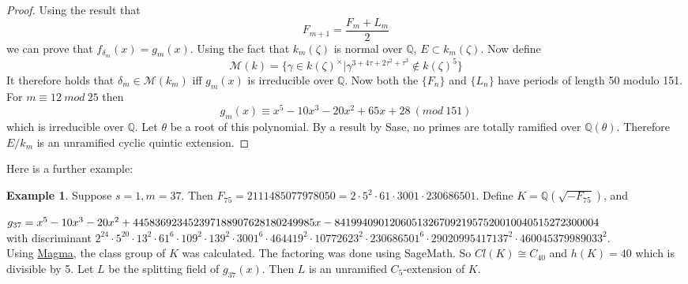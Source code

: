 \documentclass[12pt]{extarticle}
\newcommand{\Q}{\mathbb{Q}}
\newcommand{\<}{\langle}
\renewcommand{\>}{\rangle}
\theoremstyle{definition}
\newtheorem*{example}{Example}
\begin{document}
\begin{proof}
Using the result that \begin{equation}
    F_{m+1}= \frac{F_m + L_m}{2}
\end{equation}
we can prove that $f_{\delta_m}(x) = g_m(x)$. Using the fact that $k_m(\zeta)$ is normal over $\Q$, $E\subset k_m(\zeta)$. Now define  \begin{equation}
    \mathcal{M}(k)=\{\gamma \in k(\zeta)^{\times}|\gamma^{3+4\tau+2\tau^{2}+\tau^3}\notin k(\zeta)^5\}
\end{equation}
It therefore holds that $\delta_m \in \mathcal{M}(k_m)$ iff $g_m(x)$ is irreducible over $\Q$. Now both the $\{F_n\}$ and $\{L_n\}$ have periods of length 50 modulo 151. For $m\equiv12 \: mod \: 25$ then \begin{equation}
    g_m(x) \equiv x^5 - 10x^3 - 20x^2 + 65x + 28\:(mod \:151)
\end{equation} which is irreducible over $\Q$. Let $\theta$ be a root of this polynomial. By a result by Sase, no primes are totally ramified over $\Q(\theta)$. Therefore $E/k_m$ is an unramified cyclic quintic extension. 
\end{proof}
Here is a further example:
\begin{example}
Suppose $s=1, m= 37$. Then $F_{75} = 2111485077978050 = 2 \cdot 5^2 \cdot 61 \cdot 3001 \cdot 230686501$. Define $K = \Q(\sqrt{-F_{75}})$, and 


$g_{37} = x^5 - 10x^3 - 20x^2 + \\445836923452397188907628180249985x  \\- 841994090120605132670921957520010040515272300004
$ \\
with discriminant $2^{24} \cdot 5^{20} \cdot 13^2 \cdot 61^6 \cdot 109^2 \cdot 139^2 \cdot 3001^6 \cdot 464419^2 \cdot 10772623^2 \cdot 230686501^6 \cdot 29020995417137^2 \cdot 460045379989033^2$.  \\
Using \href{http://magma.maths.usyd.edu.au/calc/}{Magma}, the class group of $K$ was calculated. The factoring was done using SageMath. So $Cl(K) \cong C_{40} $ and $h(K) = 40$ which is divisible by 5. Let $L$ be the splitting field of $g_{37}(x)$. Then $L$ is an unramified $C_5$-extension of $K$. 
\end{example}
\end{document}
